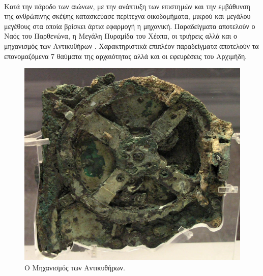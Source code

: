 \documentclass[a4paper,12pt,twoside]{report}
\begin{document}
			\paragraph{}{Κατά την πάροδο των αιώνων, με την ανάπτυξη των επιστημών και την εμβάθυνση της ανθρώπινης σκέψης κατασκεύασε περίτεχνα οικοδομήματα, μικρού και μεγάλου μεγέθους στα οποία βρίσκει άρτια εφαρμογή η μηχανική. Παραδείγματα αποτελούν ο Ναός του Παρθενώνα, η Μεγάλη Πυραμίδα του Χέοπα, οι τριήρεις αλλά και ο μηχανισμός των Αντικυθήρων \cite{ΜηχανισμόςΑντικυθήρων}. Χαρακτηριστικά επιπλέον παραδείγματα αποτελούν τα επονομαζόμενα 7 θαύματα της αρχαιότητας \cite{ΕπτάΘαύματαΑρχαίουΚόσμου} αλλά και οι εφευρέσεις του Αρχιμήδη.
			}
			\begin{figure}[hp]
					\centering
					\includegraphics[scale=0.30]{Machine_Anticythere.jpg}
					\caption{Ο Μηχανισμός των Αντικυθήρων.\cite{ΜηχανισμόςΑντικυθήρωνWikipedia}}
					\label{φωτ:Ο Μηχανισμός των Αντικυθήρων}
			\end{figure}
			
\end{document}
